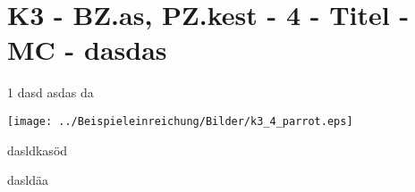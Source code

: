 \section{K3 - BZ.as, PZ.kest - 4 - Titel - MC - dasdas}

\begin{langesbeispiel} \item[1] %
dasd   asdas da 

\texttt{[image: ../Beispieleinreichung/Bilder/k3\_4\_parrot.eps]}

dasldkasöd

dasldäa
\end{langesbeispiel}